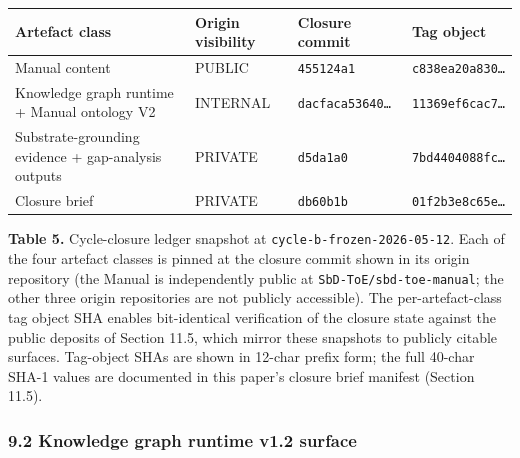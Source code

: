 \documentclass[
]{article}
\begin{document}
\begin{longtable}[]{@{}
  >{\raggedright\arraybackslash}p{}
  >{\raggedright\arraybackslash}p{}
  >{\raggedright\arraybackslash}p{}
  >{\raggedright\arraybackslash}p{}@{}}
\toprule\noalign{}
\begin{minipage}[b]{\linewidth}\raggedright
Artefact class
\end{minipage} & \begin{minipage}[b]{\linewidth}\raggedright
Origin visibility
\end{minipage} & \begin{minipage}[b]{\linewidth}\raggedright
Closure commit
\end{minipage} & \begin{minipage}[b]{\linewidth}\raggedright
Tag object
\end{minipage} \\
\midrule\noalign{}
\endhead
\bottomrule\noalign{}
\endlastfoot
Manual content & PUBLIC & \texttt{455124a1} & \texttt{c838ea20a830…} \\
Knowledge graph runtime + Manual ontology V2 & INTERNAL &
\texttt{dacfaca53640…} & \texttt{11369ef6cac7…} \\
Substrate-grounding evidence + gap-analysis outputs & PRIVATE &
\texttt{d5da1a0} & \texttt{7bd4404088fc…} \\
Closure brief & PRIVATE & \texttt{db60b1b} & \texttt{01f2b3e8c65e…} \\
\end{longtable}

\textbf{Table 5.} Cycle-closure ledger snapshot at
\texttt{cycle-b-frozen-2026-05-12}. Each of the four artefact classes is
pinned at the closure commit shown in its origin repository (the Manual
is independently public at \texttt{SbD-ToE/sbd-toe-manual}; the other
three origin repositories are not publicly accessible). The
per-artefact-class tag object SHA enables bit-identical verification of
the closure state against the public deposits of Section 11.5, which
mirror these snapshots to publicly citable surfaces. Tag-object SHAs are
shown in 12-char prefix form; the full 40-char SHA-1 values are
documented in this paper's closure brief manifest (Section 11.5).

\subsubsection{9.2 Knowledge graph runtime v1.2
surface}\label{knowledge-graph-runtime-v1.2-surface}
\end{document}
